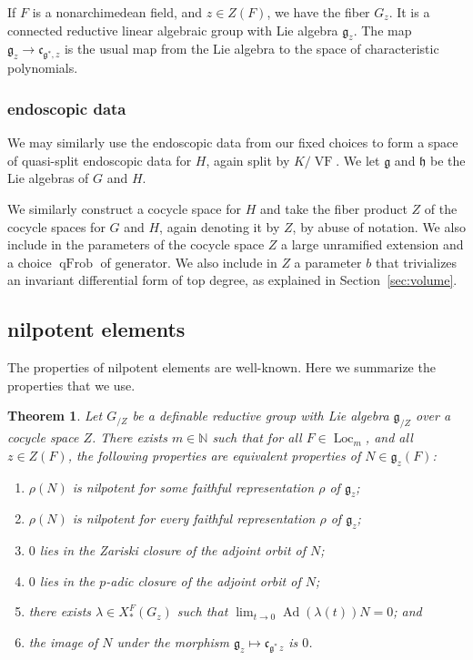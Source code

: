 \documentclass[12pt]{amsart}
\newcommand{\op}[1]{\operatorname{#1}}
\newcommand{\ring}[1]{{\mathbb #1}}
\def\VF{{\op{VF}}}
\newcommand{\fg}{\mathfrak{g}}
\newcommand{\fc}{\mathfrak{c}}
\newcommand{\fh}{\mathfrak{h}}
\theoremstyle{plain}
\newtheorem{theorem}[thm]{Theorem}
\theoremstyle{definition}
\begin{document}
If $F$ is a nonarchimedean field, and $z\in Z(F)$, we have the fiber
$G_z$.  It is a connected reductive linear algebraic group with Lie
algebra $\fg_z$.  The map $\fg_z\to \fc_{\fg^{*},z}$ is the usual map
from the Lie algebra to the space of characteristic polynomials.

\subsubsection{endoscopic data}

We may similarly use the endoscopic data from our fixed choices to form
a space of quasi-split endoscopic data for $H$, again split by $K/\VF$.  
We let $\fg$ and $\fh$ be the Lie algebras of $G$ and $H$.

We
similarly construct a cocycle space for $H$ and take the fiber product
$Z$ of the cocycle spaces for $G$ and $H$, again denoting it by $Z$,
by abuse of notation.  We also include in the parameters of
the cocycle space $Z$ a large unramified extension and a choice
$\op{qFrob}$ of generator.
We also
include in $Z$ a parameter $b$ that trivializes an invariant
differential form of top degree, as explained in Section~\ref{sec:volume}.




\subsection{nilpotent elements}\label{sec:nilpotent}

The properties of nilpotent elements are well-known.  Here we
summarize the properties that we use.

\begin{theorem} 
  Let $G_{/Z}$ be a definable reductive group with Lie algebra
  $\fg_{/Z}$ over a cocycle space $Z$.  There exists $m\in\ring{N}$
  such that for all $F\in\op{Loc}_m$, and all $z\in Z(F)$, the
  following properties are equivalent properties of $N\in \fg_z(F)$:
\begin{enumerate}
\item $\rho(N)$ is nilpotent for {\it some} faithful representation $\rho$
 of  $\fg_z$;
\item $\rho(N)$ is nilpotent for {\it every} faithful representation $\rho$
 of  $\fg_z$;
\item $0$ lies in the Zariski closure of the adjoint orbit of $N$;
\item $0$ lies in the $p$-adic closure of the adjoint orbit of $N$;
\item there exists $\lambda\in X_*^F(G_z)$ such that $\lim_{t\to 0}
  \op{Ad}(\lambda(t))N = 0$; and
\item the image of $N$ under the morphism $\fg_z\mapsto \fc_{\fg^*\,z}$
  is $0$.
\end{enumerate}
\end{theorem}
\end{document}
